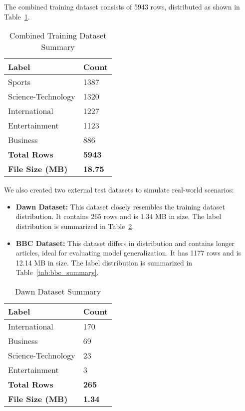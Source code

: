 \documentclass[sigconf]{acmart}
\begin{document}
The combined training dataset consists of 5943 rows, distributed as shown in Table~\ref{tab:combined_summary}.

\begin{table}[h]
    \caption{Combined Training Dataset Summary}
    \label{tab:combined_summary}
    \begin{tabular}{|l|l|}
        \hline
        \textbf{Label} & \textbf{Count} \\
        \hline
        Sports & 1387 \\
        Science-Technology & 1320 \\
        International & 1227 \\
        Entertainment & 1123 \\
        Business & 886 \\
        \hline
        \textbf{Total Rows} & \textbf{5943} \\
        \hline
        \textbf{File Size (MB)} & \textbf{18.75} \\
        \hline
    \end{tabular}
\end{table}

We also created two external test datasets to simulate real-world scenarios:

\begin{itemize}
    \item \textbf{Dawn Dataset:} This dataset closely resembles the training dataset distribution. It contains 265 rows and is 1.34 MB in size. The label distribution is summarized in Table~\ref{tab:dawn_summary}.
    \item \textbf{BBC Dataset:} This dataset differs in distribution and contains longer articles, ideal for evaluating model generalization. It has 1177 rows and is 12.14 MB in size. The label distribution is summarized in Table~\ref{tab:bbc_summary}.
\end{itemize}

\begin{table}[h]
    \caption{Dawn Dataset Summary}
    \label{tab:dawn_summary}
    \begin{tabular}{|l|l|}
        \hline
        \textbf{Label} & \textbf{Count} \\
        \hline
        International & 170 \\
        Business & 69 \\
        Science-Technology & 23 \\
        Entertainment & 3 \\
        \hline
        \textbf{Total Rows} & \textbf{265} \\
        \textbf{File Size (MB)} & \textbf{1.34} \\
        \hline
    \end{tabular}
\end{table}
\end{document}
